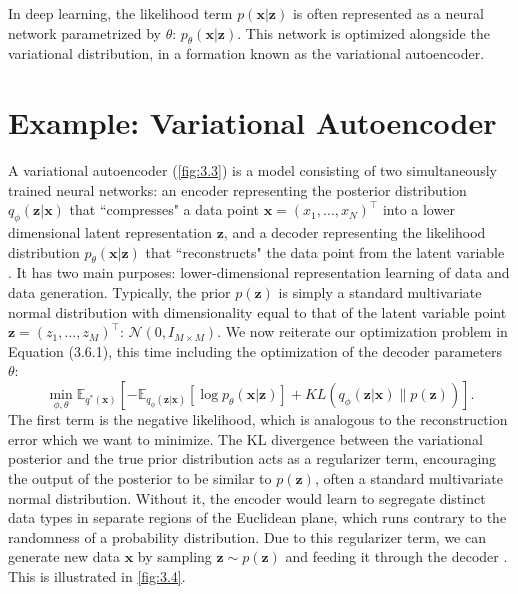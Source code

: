 \documentclass[honours,12pt]{unswthesis}
\newcommand{\E}{\mathbb{E}}
\numberwithin{equation}{section}
\theoremstyle{definition}
\begin{document}
In deep learning, the likelihood term $p(\bm{x}|\bm{z})$ is often represented as a neural network parametrized by $\theta$: $p_\theta(\bm{x}|\bm{z})$. This network is optimized alongside the variational distribution, in a formation known as the variational autoencoder.
\section{Example: Variational Autoencoder}\label{sec:3.7}
A variational autoencoder (\autoref{fig:3.3}) is a model consisting of two simultaneously trained neural networks: an encoder representing the posterior distribution $q_\phi(\bm{z}|\bm{x})$ that ``compresses" a data point $\bm{x}=(x_1,\dots,x_N)^\top$ into a lower dimensional latent representation $\bm{z}$, and a decoder representing the likelihood distribution $p_\theta(\bm{x}|\bm{z})$ that ``reconstructs" the data point from the latent variable \citep{kingma}. It has two main purposes: lower-dimensional representation learning of data and data generation. Typically, the prior $p(\bm{z})$ is simply a standard multivariate normal distribution with dimensionality equal to that of the latent variable point \\$\bm{z}=(z_1,\dots,z_M)^\top$: $\mathcal{N}(0,I_{M\times M})$. We now reiterate our optimization problem in Equation (3.6.1), this time including the optimization of the decoder parameters $\theta$:
\begin{equation}
\min_{\phi,\theta} \mathbb{E}_{q^*(\bm{x})}\left[-\E_{q_\phi(\bm{z}|\bm{x})}[\log p_\theta(\bm{x}|\bm{z})]+KL(q_\phi(\bm{z}|\bm{x})\|p(\bm{z}))\right].
\end{equation}
The first term is the negative likelihood, which is analogous to the reconstruction error which we want to minimize. The KL divergence between the variational posterior and the true prior distribution acts as a regularizer term, encouraging the output of the posterior to be similar to $p(\bm{z})$, often a standard multivariate normal distribution. Without it, the encoder would learn to segregate distinct data types in separate regions of the Euclidean plane, which runs contrary to the randomness of a probability distribution. Due to this regularizer term, we can generate new data $\bm{x}$ by sampling $\bm{z}\sim p(\bm{z})$ and feeding it through the decoder \citep{vae}. This is illustrated in \autoref{fig:3.4}.
\end{document}
